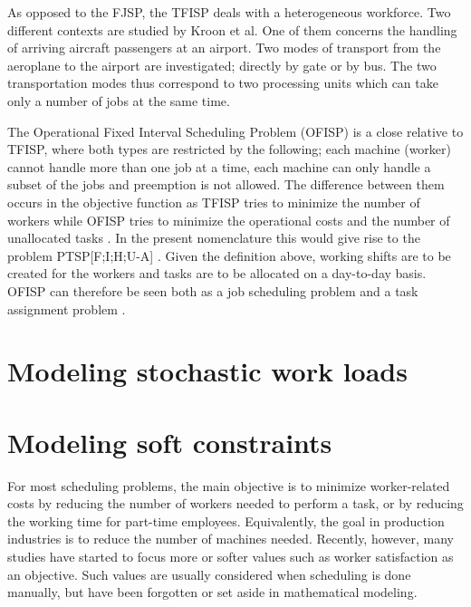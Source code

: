 As opposed to the FJSP, the TFISP deals with a heterogeneous workforce. Two different contexts are studied by Kroon et al. One of them concerns the handling of arriving aircraft passengers at an airport. Two modes of transport from the aeroplane to the airport are investigated; directly by gate or by bus. The two transportation modes thus correspond to two processing units which can take only a number of jobs at the same time.

The Operational Fixed Interval Scheduling Problem (OFISP) is a close relative to TFISP, where both types are restricted by the following; each machine (worker) cannot handle more than one job at a time, each machine can only handle a subset of the jobs and preemption is not allowed. The difference between them occurs in the objective function as TFISP tries to minimize the number of workers while OFISP tries to minimize the operational costs and the number of unallocated tasks \cite{kroon_1993}. In the present nomenclature this would give rise to the problem PTSP[F;I;H;U-A] \cite{krishnamoorthy_2001}. Given the definition above, working shifts are to be created for the workers and tasks are to be allocated on a day-to-day basis. OFISP can therefore be seen both as a job scheduling problem and a task assignment problem \cite{kroon_1993}.



%


\section{Modeling stochastic work loads}

\section{Modeling soft constraints} \label{WLA}
For most scheduling problems, the main objective is to minimize worker-related costs by reducing the number of workers needed to perform a task, or by reducing the working time for part-time employees. Equivalently, the goal in production industries is to reduce the number of machines needed. Recently, however, many studies have started to focus more or softer values such as worker satisfaction as an objective. Such values are usually considered when scheduling is done manually, but have been forgotten or set aside in mathematical modeling.

